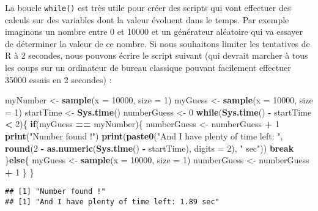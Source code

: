 \documentclass[]{book}
\newenvironment{Shaded}{\begin{snugshade}}{\end{snugshade}}
\newcommand{\KeywordTok}[1]{\textcolor[rgb]{0.13,0.29,0.53}{\textbf{#1}}}
\newcommand{\DataTypeTok}[1]{\textcolor[rgb]{0.13,0.29,0.53}{#1}}
\newcommand{\DecValTok}[1]{\textcolor[rgb]{0.00,0.00,0.81}{#1}}
\newcommand{\StringTok}[1]{\textcolor[rgb]{0.31,0.60,0.02}{#1}}
\newcommand{\ControlFlowTok}[1]{\textcolor[rgb]{0.13,0.29,0.53}{\textbf{#1}}}
\newcommand{\OperatorTok}[1]{\textcolor[rgb]{0.81,0.36,0.00}{\textbf{#1}}}
\newcommand{\NormalTok}[1]{#1}
\theoremstyle{definition}
\theoremstyle{definition}
\theoremstyle{definition}
\theoremstyle{remark}
\begin{document}
La boucle \texttt{while()} est très utile pour créer des scripts qui
vont effectuer des calculs sur des variables dont la valeur évoluent
dans le temps. Par exemple imaginons un nombre entre 0 et 10000 et un
générateur aléatoire qui va essayer de déterminer la valeur de ce
nombre. Si nous souhaitons limiter les tentatives de R à 2 secondes,
nous pouvons écrire le script suivant (qui devrait marcher à tous les
coups sur un ordinateur de bureau classique pouvant facilement effectuer
35000 essais en 2 secondes) :

\begin{Shaded}
\begin{Highlighting}[]
\NormalTok{myNumber <-}\StringTok{ }\KeywordTok{sample}\NormalTok{(}\DataTypeTok{x =} \DecValTok{10000}\NormalTok{, }\DataTypeTok{size =} \DecValTok{1}\NormalTok{)}
\NormalTok{myGuess <-}\StringTok{ }\KeywordTok{sample}\NormalTok{(}\DataTypeTok{x =} \DecValTok{10000}\NormalTok{, }\DataTypeTok{size =} \DecValTok{1}\NormalTok{)}
\NormalTok{startTime <-}\StringTok{ }\KeywordTok{Sys.time}\NormalTok{()}
\NormalTok{numberGuess <-}\StringTok{ }\DecValTok{0}
\ControlFlowTok{while}\NormalTok{(}\KeywordTok{Sys.time}\NormalTok{() }\OperatorTok{-}\StringTok{ }\NormalTok{startTime }\OperatorTok{<}\StringTok{ }\DecValTok{2}\NormalTok{)\{}
  \ControlFlowTok{if}\NormalTok{(myGuess }\OperatorTok{==}\StringTok{ }\NormalTok{myNumber)\{}
\NormalTok{    numberGuess <-}\StringTok{ }\NormalTok{numberGuess }\OperatorTok{+}\StringTok{ }\DecValTok{1}
    \KeywordTok{print}\NormalTok{(}\StringTok{"Number found !"}\NormalTok{)}
    \KeywordTok{print}\NormalTok{(}\KeywordTok{paste0}\NormalTok{(}\StringTok{"And I have plenty of time left: "}\NormalTok{, }
      \KeywordTok{round}\NormalTok{(}\DecValTok{2} \OperatorTok{-}\StringTok{ }\KeywordTok{as.numeric}\NormalTok{(}\KeywordTok{Sys.time}\NormalTok{() }\OperatorTok{-}\StringTok{ }\NormalTok{startTime), }\DataTypeTok{digits =} \DecValTok{2}\NormalTok{), }
      \StringTok{" sec"}\NormalTok{))}
    \ControlFlowTok{break}
\NormalTok{  \}}\ControlFlowTok{else}\NormalTok{\{}
\NormalTok{    myGuess <-}\StringTok{ }\KeywordTok{sample}\NormalTok{(}\DataTypeTok{x =} \DecValTok{10000}\NormalTok{, }\DataTypeTok{size =} \DecValTok{1}\NormalTok{)}
\NormalTok{    numberGuess <-}\StringTok{ }\NormalTok{numberGuess }\OperatorTok{+}\StringTok{ }\DecValTok{1}
\NormalTok{  \}}
\NormalTok{\}}
\end{Highlighting}
\end{Shaded}

\begin{verbatim}
## [1] "Number found !"
## [1] "And I have plenty of time left: 1.89 sec"
\end{verbatim}
\end{document}
